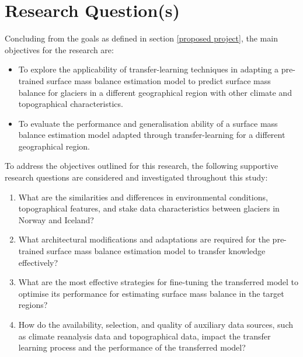 \section{Research Question(s)}\label{research questions}


Concluding from the goals as defined in section \ref{proposed project}, the main objectives for the research are:
\begin{itemize}
    \item To explore the applicability of transfer-learning techniques in adapting a pre-trained surface mass balance estimation model to predict surface mass balance for glaciers in a different geographical region with other climate and topographical characteristics.
    \item To evaluate the performance and generalisation ability of a surface mass balance estimation model adapted through transfer-learning for a different geographical region.
\end{itemize}

To address the objectives outlined for this research, the following supportive research questions are considered and investigated throughout this study: 

\begin{enumerate}
    \item\label{rq1} What are the similarities and differences in environmental conditions, topographical features, and stake data characteristics between glaciers in Norway and Iceland?
    \item\label{rq2} What architectural modifications and adaptations are required for the pre-trained surface mass balance estimation model to transfer knowledge effectively?
    \item\label{rq3} What are the most effective strategies for fine-tuning the transferred model to optimise its performance for estimating surface mass balance in the target regions?
    \item\label{rq4} How do the availability, selection, and quality of auxiliary data sources, such as climate reanalysis data and topographical data, impact the transfer learning process and the performance of the transferred model?
\end{enumerate}